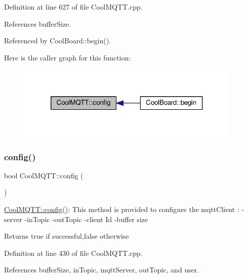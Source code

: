 Definition at line 627 of file Cool\+M\+Q\+T\+T.\+cpp.



References buffer\+Size.



Referenced by Cool\+Board\+::begin().

Here is the caller graph for this function\+:
\nopagebreak
\begin{figure}[H]
\begin{center}
\leavevmode
\includegraphics[width=305pt]{d0/dd0/class_cool_m_q_t_t_a9b703de4f1358f0ee7a5e8c44979c648_icgraph}
\end{center}
\end{figure}
\mbox{\label{class_cool_m_q_t_t_a6571671781a505feca9a8a56e256c6bc}} 
\subsubsection{\texorpdfstring{config()}{config()}\hspace{0.1cm}{\footnotesize\ttfamily [2/2]}}
{\footnotesize\ttfamily bool Cool\+M\+Q\+T\+T\+::config (\begin{DoxyParamCaption}{ }\end{DoxyParamCaption})}

\hyperlink{class_cool_m_q_t_t_a6571671781a505feca9a8a56e256c6bc}{Cool\+M\+Q\+T\+T\+::config()}\+: This method is provided to configure the mqtt\+Client \+: -\/server -\/in\+Topic -\/out\+Topic -\/client Id -\/buffer size

\begin{DoxyReturn}{Returns}
true if successful,false otherwise 
\end{DoxyReturn}


Definition at line 430 of file Cool\+M\+Q\+T\+T.\+cpp.



References buffer\+Size, in\+Topic, mqtt\+Server, out\+Topic, and user.

\mbox{\label{class_cool_m_q_t_t_a30d82ad665bfb603f46ecdbc290775df}} 
